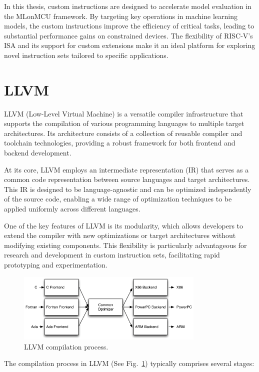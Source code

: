 In this thesis, custom instructions are designed to accelerate model evaluation in the MLonMCU framework. By targeting key operations in machine learning models, the custom instructions improve the efficiency of critical tasks, leading to substantial performance gains on constrained devices. The flexibility of RISC-V's ISA and its support for custom extensions make it an ideal platform for exploring novel instruction sets tailored to specific applications.

\section{LLVM}

LLVM (Low-Level Virtual Machine) is a versatile compiler infrastructure that supports the compilation of various programming languages to multiple target architectures. Its architecture consists of a collection of reusable compiler and toolchain technologies, providing a robust framework for both frontend and backend development.

At its core, LLVM employs an intermediate representation (IR) that serves as a common code representation between source languages and target architectures. This IR is designed to be language-agnostic and can be optimized independently of the source code, enabling a wide range of optimization techniques to be applied uniformly across different languages.

One of the key features of LLVM is its modularity, which allows developers to extend the compiler with new optimizations or target architectures without modifying existing components. This flexibility is particularly advantageous for research and development in custom instruction sets, facilitating rapid prototyping and experimentation.

\begin{figure}
    \centering
    \includegraphics[width=0.8\textwidth]{figures/llvm.png}
    \caption{LLVM compilation process. \cite{llvmfigure}}
    \label{fig:llvm}
\end{figure}

The compilation process in LLVM (See Fig.~\ref{fig:llvm}) typically comprises several stages:

